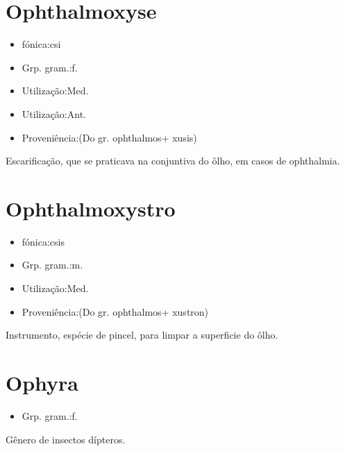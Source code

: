 \section{Ophthalmoxyse}
\begin{itemize}
\item {fónica:csi}
\end{itemize}
\begin{itemize}
\item {Grp. gram.:f.}
\end{itemize}
\begin{itemize}
\item {Utilização:Med.}
\end{itemize}
\begin{itemize}
\item {Utilização:Ant.}
\end{itemize}
\begin{itemize}
\item {Proveniência:(Do gr. \textunderscore ophthalmos\textunderscore  + \textunderscore xusis\textunderscore )}
\end{itemize}
Escarificação, que se praticava na conjuntiva do ôlho, em casos de ophthalmia.
\section{Ophthalmoxystro}
\begin{itemize}
\item {fónica:csis}
\end{itemize}
\begin{itemize}
\item {Grp. gram.:m.}
\end{itemize}
\begin{itemize}
\item {Utilização:Med.}
\end{itemize}
\begin{itemize}
\item {Proveniência:(Do gr. \textunderscore ophthalmos\textunderscore  + \textunderscore xustron\textunderscore )}
\end{itemize}
Instrumento, espécie de pincel, para limpar a superficie do ôlho.
\section{Ophyra}
\begin{itemize}
\item {Grp. gram.:f.}
\end{itemize}
Gênero de insectos dípteros.
